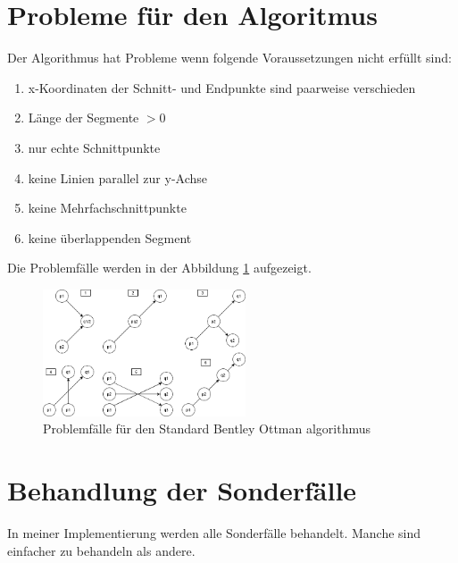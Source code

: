 \documentclass[conference]{IEEEtran}
\begin{document}
	\section{Probleme für den Algoritmus}
	Der Algorithmus hat Probleme wenn folgende Voraussetzungen nicht erfüllt sind:
	\begin{enumerate}
		\item x-Koordinaten der Schnitt- und Endpunkte sind paarweise verschieden
		
		\item Länge der Segmente $> 0$
		
		\item nur echte Schnittpunkte
		
		\item keine Linien parallel zur y-Achse
		
		\item keine Mehrfachschnittpunkte
		
		\item keine überlappenden Segment
	\end{enumerate}
	Die Problemfälle werden in der Abbildung \ref{Problem} aufgezeigt.
	\begin{figure}[h]
		\begin{center}
			\includegraphics[width=6cm]{ProblemFaelle.png}
			\caption{Problemfälle für den Standard Bentley Ottman algorithmus}
			\label{Problem}
		\end{center}
	\end{figure}

	\section{Behandlung der Sonderfälle}
	In meiner Implementierung werden alle Sonderfälle behandelt. Manche sind einfacher zu behandeln als andere.
\end{document}
